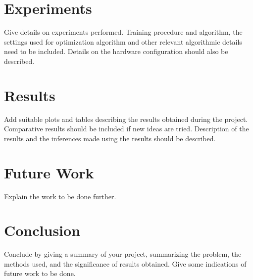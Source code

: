 \documentclass[twoside,english]{article}
\begin{document}
\section{Experiments} \label{sec:exp}

Give details on experiments performed. Training procedure and algorithm, the settings used for optimization algorithm and other relevant algorithmic details need to be included. Details on the hardware configuration should also be described. 

\section{Results}\label{sec:results}

Add suitable plots and tables describing the results obtained during the project. Comparative results should be included if new ideas are tried. Description of the results and the inferences made using the results should be described. 

\section{Future Work} \label{sec:future_work}

Explain the work to be done further. 

\section{Conclusion} \label{sec:conclusion}

Conclude by giving a summary of your project, summarizing the problem, the methods used, and the significance of results obtained. Give some indications of future work to be done. 


\end{document}
